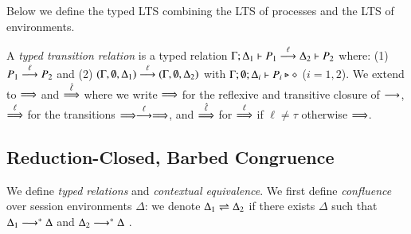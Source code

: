 Below we define the typed LTS combining 
the LTS of processes and the LTS of environments. 

\smallskip

\begin{definition}\label{d:tlts}\rm
A {\em typed transition relation} is a typed relation
$\Gamma; \Delta_1 \vdash P_1 \stackrel{\ell}{\longrightarrow} \Delta_2 \vdash P_2$
	where:
%
(1) $P_1 \stackrel{\ell}{\longrightarrow} P_2$ and (2) 
$(\Gamma, \emptyset, \Delta_1) \stackrel{\ell}{\longrightarrow} (\Gamma, \emptyset, \Delta_2)$ 
with $\Gamma; \emptyset; \Delta_i \vdash P_i \triangleright \diamond$ 
($i=1,2$).
%
%
We extend to $\stackrel{}{\Longrightarrow}$ 
and $\stackrel{\hat{\ell}}{\Longrightarrow}$ 
where we write 
$\stackrel{}{\Longrightarrow}$ for the reflexive and
transitive closure of $\stackrel{}{\longrightarrow}$, $\stackrel{\ell}{\Longrightarrow}$ for the transitions
$\stackrel{}{\Longrightarrow}\stackrel{\ell}{\longrightarrow}\stackrel{}{\Longrightarrow}$, and $\stackrel{\hat{\ell}}{\Longrightarrow}$ for $\stackrel{\ell}{\Longrightarrow}$ if
$\ell\not = \tau$ otherwise $\stackrel{}{\Longrightarrow}$. 
\end{definition}

\subsection{Reduction-Closed, Barbed Congruence}
\label{subsec:rc}
\noi We define \emph{typed relations} and \emph{contextual equivalence}.  
We first define \emph{confluence}
over session environments $\Delta$:
we denote $\Delta_1 \rightleftharpoons \Delta_2$ if there exists $\Delta$ such that
	$\Delta_1 \longrightarrow^\ast \Delta$ and $\Delta_2 \longrightarrow^\ast \Delta$
	.


